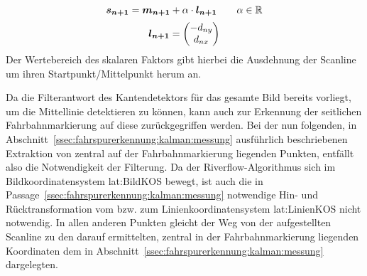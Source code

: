 \begin{equation}
\label{eq:riverflow:solidline:scanlinecontinous}
\boldsymbol{s_{n+1}} =
\boldsymbol{m_{n+1}}  + \alpha \cdot \boldsymbol{l_{n+1}}
\qquad \alpha \in \mathbb{R}
\end{equation}
\begin{equation}
\label{eq:riverflow:solidline:scanlinedirectionvec}
\boldsymbol{l_{n+1}} =
\begin{pmatrix}
-d_{ny} \\
d_{nx}
\end{pmatrix}
\end{equation}
Der Wertebereich des skalaren Faktors \scl{\alpha} gibt hierbei die Ausdehnung der Scanline um ihren Startpunkt/Mittelpunkt  herum an.

Da die Filterantwort des Kantendetektors für das gesamte Bild bereits vorliegt, um die Mittellinie detektieren zu können, kann auch zur Erkennung der seitlichen Fahrbahnmarkierung auf diese zurückgegriffen werden. Bei der nun folgenden, in Abschnitt~\ref{ssec:fahrspurerkennung:kalman:messung} ausführlich beschriebenen Extraktion von zentral auf der Fahrbahnmarkierung liegenden Punkten, entfällt also die Notwendigkeit der Filterung. Da der Riverflow-Algorithmus sich im Bildkoordinatensystem \gls{lat:BildKOS} bewegt, ist auch die in Passage~\ref{ssec:fahrspurerkennung:kalman:messung} notwendige Hin- und Rücktransformation vom bzw. zum Linienkoordinatensystem \gls{lat:LinienKOS} nicht notwendig. In allen anderen Punkten gleicht der Weg von der aufgestellten Scanline  zu den darauf ermittelten, zentral in der Fahrbahnmarkierung liegenden Koordinaten  dem in Abschnitt~\ref{ssec:fahrspurerkennung:kalman:messung} dargelegten.

